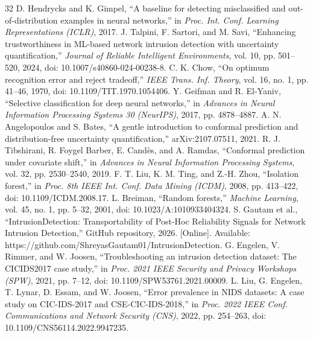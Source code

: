 \documentclass[conference]{IEEEtran}
\begin{document}
\begin{thebibliography}{32}
D. Hendrycks and K. Gimpel, ``A baseline for detecting misclassified and out-of-distribution examples in neural networks,'' in \emph{Proc. Int. Conf. Learning Representations (ICLR)}, 2017.
J. Talpini, F. Sartori, and M. Savi, ``Enhancing trustworthiness in ML-based network intrusion detection with uncertainty quantification,'' \emph{Journal of Reliable Intelligent Environments}, vol. 10, pp. 501--520, 2024, doi: 10.1007/s40860-024-00238-8.
C. K. Chow, ``On optimum recognition error and reject tradeoff,'' \emph{IEEE Trans. Inf. Theory}, vol. 16, no. 1, pp. 41--46, 1970, doi: 10.1109/TIT.1970.1054406.
Y. Geifman and R. El-Yaniv, ``Selective classification for deep neural networks,'' in \emph{Advances in Neural Information Processing Systems 30 (NeurIPS)}, 2017, pp. 4878--4887.
A. N. Angelopoulos and S. Bates, ``A gentle introduction to conformal prediction and distribution-free uncertainty quantification,'' arXiv:2107.07511, 2021.
R. J. Tibshirani, R. Foygel Barber, E. Cand\`es, and A. Ramdas, ``Conformal prediction under covariate shift,'' in \emph{Advances in Neural Information Processing Systems}, vol. 32, pp. 2530--2540, 2019.
F. T. Liu, K. M. Ting, and Z.-H. Zhou, ``Isolation forest,'' in \emph{Proc. 8th IEEE Int. Conf. Data Mining (ICDM)}, 2008, pp. 413--422, doi: 10.1109/ICDM.2008.17.
L. Breiman, ``Random forests,'' \emph{Machine Learning}, vol. 45, no. 1, pp. 5--32, 2001, doi: 10.1023/A:1010933404324.
S. Gautam et al., ``IntrusionDetection: Transportability of Post-Hoc Reliability Signals for Network Intrusion Detection,'' GitHub repository, 2026. [Online]. Available: https://github.com/ShreyasGautam01/IntrusionDetection.
G. Engelen, V. Rimmer, and W. Joosen, ``Troubleshooting an intrusion detection dataset: The CICIDS2017 case study,'' in \emph{Proc. 2021 IEEE Security and Privacy Workshops (SPW)}, 2021, pp. 7--12, doi: 10.1109/SPW53761.2021.00009.
L. Liu, G. Engelen, T. Lynar, D. Essam, and W. Joosen, ``Error prevalence in NIDS datasets: A case study on CIC-IDS-2017 and CSE-CIC-IDS-2018,'' in \emph{Proc. 2022 IEEE Conf. Communications and Network Security (CNS)}, 2022, pp. 254--263, doi: 10.1109/CNS56114.2022.9947235.
\end{thebibliography}
\end{document}
